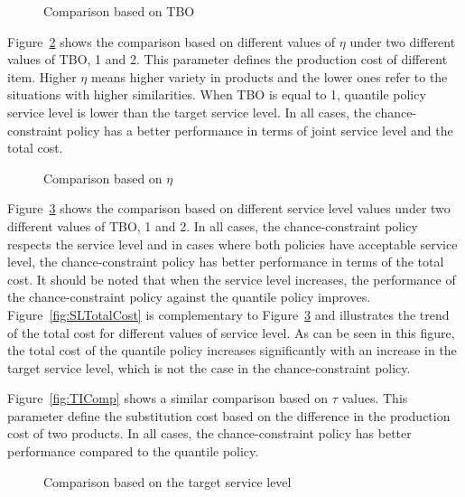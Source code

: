 \documentclass[11pt]{article}
\newcommand{\cred}{\color{black}}
\begin{document}
\begin{figure}[H]
    \centering
    \caption{Comparison based on TBO}%
    \label{fig:TBOComp}%
\end{figure}


Figure~\ref{fig:ETAComp} shows the comparison based on different values of $\eta$ under two different values of TBO, 1 and 2. This parameter defines the production cost of different item. Higher $\eta$ means higher variety in products and the lower ones refer to the situations with higher similarities. {\cred When TBO is equal to 1, quantile policy service level is lower than the target service level.} In all cases, the chance-constraint policy has a better performance in terms of joint service level and the total cost. 

\begin{figure}%
    \centering
    \caption{Comparison based on $\eta$}%
    \label{fig:ETAComp}%
\end{figure}

Figure~\ref{fig:SLComp} shows the comparison based on different service level values under two different values of TBO, 1 and 2. In all cases, the chance-constraint policy respects the service level and in cases where both policies have acceptable service level, the chance-constraint policy has better performance in terms of the total cost. It should be noted that when the service level increases, the performance of the chance-constraint policy against the quantile policy improves. Figure~\ref{fig:SLTotalCost} is complementary to Figure~\ref{fig:SLComp} and illustrates the trend of the total cost for different values of service level. As can be seen in this figure, the total cost of the quantile policy increases significantly with an increase in the target service level, which is not the case in the chance-constraint policy.

Figure~\ref{fig:TIComp} shows a similar comparison based on $\tau$ values. This parameter define the substitution cost based on the difference in the production cost of two products. In all cases, the chance-constraint policy has better performance compared to the quantile policy.

\begin{figure}[H]
    \centering
    \caption{Comparison based on the target service level}%
    \label{fig:SLComp}%
\end{figure}
\end{document}
